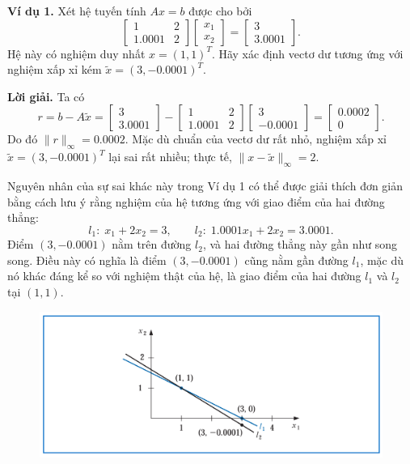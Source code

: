 \textbf{Ví dụ 1.}  
Xét hệ tuyến tính \( A x = b \) được cho bởi
\[
\begin{bmatrix}
1 & 2 \\
1.0001 & 2
\end{bmatrix}
\begin{bmatrix}
x_1 \\ x_2
\end{bmatrix}
=
\begin{bmatrix}
3 \\ 3.0001
\end{bmatrix}.
\]
Hệ này có nghiệm duy nhất \( x = (1, 1)^T \).  
Hãy xác định vectơ dư tương ứng với nghiệm xấp xỉ kém 
\( \tilde{x} = (3, -0.0001)^T \).

\textbf{Lời giải.}  
Ta có
\[
r = b - A\tilde{x} = 
\begin{bmatrix}
3 \\ 3.0001
\end{bmatrix}
-
\begin{bmatrix}
1 & 2 \\ 1.0001 & 2
\end{bmatrix}
\begin{bmatrix}
3 \\ -0.0001
\end{bmatrix}
=
\begin{bmatrix}
0.0002 \\ 0
\end{bmatrix}.
\]
Do đó \( \|r\|_{\infty} = 0.0002 \).  
Mặc dù chuẩn của vectơ dư rất nhỏ, nghiệm xấp xỉ 
\( \tilde{x} = (3, -0.0001)^T \) lại sai rất nhiều; thực tế, 
\( \|x - \tilde{x}\|_{\infty} = 2 \).

Nguyên nhân của sự sai khác này trong Ví dụ 1 có thể được giải thích đơn giản 
bằng cách lưu ý rằng nghiệm của hệ tương ứng với giao điểm của hai đường thẳng:
\[
l_1 : \; x_1 + 2x_2 = 3, \qquad 
l_2 : \; 1.0001x_1 + 2x_2 = 3.0001.
\]
Điểm \( (3, -0.0001) \) nằm trên đường \( l_2 \), 
và hai đường thẳng này gần như song song.  
Điều này có nghĩa là điểm \( (3, -0.0001) \) cũng nằm gần đường \( l_1 \), 
mặc dù nó khác đáng kể so với nghiệm thật của hệ, 
là giao điểm của hai đường \( l_1 \) và \( l_2 \) tại \( (1, 1) \).

\begin{figure}[!t]
\centering
\includegraphics[width=\linewidth]{figures/figure_7.7.png}
\end{figure}

